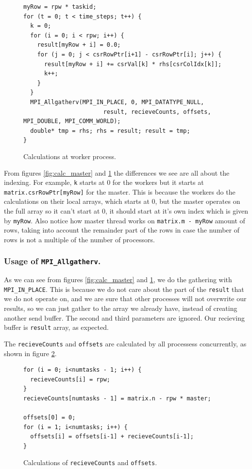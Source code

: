 \documentclass[12pt,reqno]{amsart}
\newcommand{\code}[1]{\texttt{#1}}
\begin{document}
\begin{figure}[h]
\centering
\begin{lstlisting}
myRow = rpw * taskid;
for (t = 0; t < time_steps; t++) {
  k = 0;
  for (i = 0; i < rpw; i++) {
    result[myRow + i] = 0.0;
    for (j = 0; j < csrRowPtr[i+1] - csrRowPtr[i]; j++) {
      result[myRow + i] += csrVal[k] * rhs[csrColIdx[k]];
      k++;
    }
  }
  MPI_Allgatherv(MPI_IN_PLACE, 0, MPI_DATATYPE_NULL, 
                       result, recieveCounts, offsets, MPI_DOUBLE, MPI_COMM_WORLD);
  double* tmp = rhs; rhs = result; result = tmp;
}	
\end{lstlisting}
\caption{Calculations at worker process.}
\label{fig:calc_worker}
\end{figure}
From figures \ref{fig:calc_master} and \ref{fig:calc_worker} the differences we see are all about the indexing. For example, \code{k} starts at 0 for the workers but it starts at \code{matrix.csrRowPtr[myRow]} for the master. This is because the workers do the calculations on their local arrays, which starts at $0$, but the master operates on the full array so it can't start at 0, it should start at it's own index which is given by \code{myRow}. Also notice how master thread works on \code{matrix.m - myRow} amount of rows, taking into account the remainder part of the rows in case the number of rows is not a multiple of the number of processors. 

\subsubsection{Usage of \code{MPI\_Allgatherv}.}
As we can see from figures  \ref{fig:calc_master} and \ref{fig:calc_worker}, we do the gathering with \code{MPI\_IN\_PLACE}. This is because we do not care about the part of the \code{result} that we do not operate on, and we are sure that other processes will not overwrite our results, so we can just gather to the array we already have, instead of creating another send buffer. The second and third parameters are ignored. Our recieving buffer is \code{result} array, as expected.

The \code{recieveCounts} and \code{offsets} are calculated by all processess concurrently, as shown in figure \ref{fig:calc_rcvoff}.
\begin{figure}[h]
\centering
\begin{lstlisting}
for (i = 0; i<numtasks - 1; i++) {
  recieveCounts[i] = rpw;
}
recieveCounts[numtasks - 1] = matrix.n - rpw * master;

offsets[0] = 0;
for (i = 1; i<numtasks; i++) {
  offsets[i] = offsets[i-1] + recieveCounts[i-1];
}
\end{lstlisting}
\caption{Calculations of \code{recieveCounts} and \code{offsets}.}
\label{fig:calc_rcvoff}
\end{figure}
\end{document}
